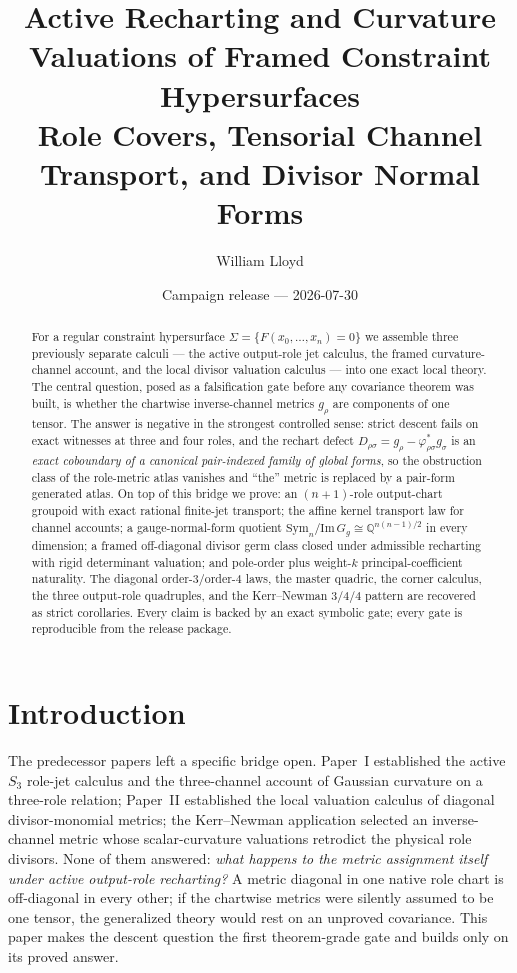 \documentclass[11pt]{article}
\title{\textbf{Active Recharting and Curvature Valuations of Framed Constraint
Hypersurfaces}\\[4pt]\large Role Covers, Tensorial Channel Transport, and Divisor
Normal Forms}
\author{William Lloyd}
\date{Campaign release --- 2026-07-30}
\theoremstyle{definition}
\newcommand{\Sig}{\Sigma}
\begin{document}
\maketitle

\begin{abstract}
\noindent For a regular constraint hypersurface $\Sig=\{F(x_0,\dots,x_n)=0\}$ we
assemble three previously separate calculi --- the active output-role jet calculus,
the framed curvature-channel account, and the local divisor valuation calculus ---
into one exact local theory. The central question, posed as a falsification gate
before any covariance theorem was built, is whether the chartwise inverse-channel
metrics $g_\rho$ are components of one tensor. The answer is negative in the
strongest controlled sense: strict descent fails on exact witnesses at three and
four roles, and the rechart defect $D_{\rho\sigma}=g_\rho-\varphi^*_{\rho\sigma}
g_\sigma$ is an \emph{exact coboundary of a canonical pair-indexed family of global
forms}, so the obstruction class of the role-metric atlas vanishes and ``the''
metric is replaced by a pair-form generated atlas. On top of this bridge we prove:
an $(n{+}1)$-role output-chart groupoid with exact rational finite-jet transport;
the affine kernel transport law for channel accounts; a gauge-normal-form quotient
$\mathrm{Sym}_n/\mathrm{Im}\,G_g\cong\mathbb{Q}^{n(n-1)/2}$ in every dimension; a
framed off-diagonal divisor germ class closed under admissible recharting with
rigid determinant valuation; and pole-order plus weight-$k$ principal-coefficient
naturality. The diagonal order-$3$/order-$4$ laws, the master quadric, the corner
calculus, the three output-role quadruples, and the Kerr--Newman $3/4/4$ pattern
are recovered as strict corollaries. Every claim is backed by an exact symbolic
gate; every gate is reproducible from the release package.
\end{abstract}

\section{Introduction}
The predecessor papers left a specific bridge open. Paper~I established the active
$S_3$ role-jet calculus and the three-channel account of Gaussian curvature on a
three-role relation; Paper~II established the local valuation calculus of diagonal
divisor-monomial metrics; the Kerr--Newman application selected an inverse-channel
metric whose scalar-curvature valuations retrodict the physical role divisors. None
of them answered: \emph{what happens to the metric assignment itself under active
output-role recharting?} A metric diagonal in one native role chart is off-diagonal
in every other; if the chartwise metrics were silently assumed to be one tensor,
the generalized theory would rest on an unproved covariance. This paper makes the
descent question the first theorem-grade gate and builds only on its proved answer.
\end{document}
